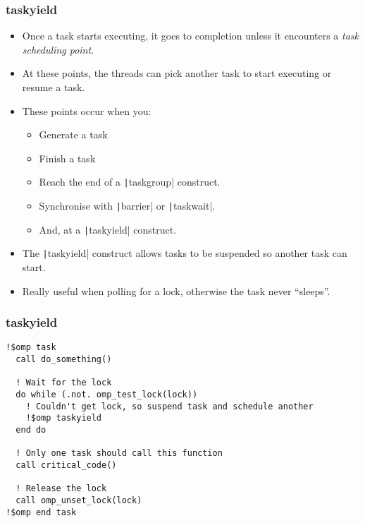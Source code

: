 \documentclass{beamer}
\begin{document}
\begin{frame}
\frametitle{taskyield}
\begin{itemize}
  \item Once a task starts executing, it goes to completion unless it encounters a \emph{task scheduling point}.
  \item At these points, the threads can pick another task to start executing or resume a task.
  \item These points occur when you:
    \begin{itemize}
      \item Generate a task
      \item Finish a task
      \item Reach the end of a \texttt|taskgroup| construct.
      \item Synchronise with \texttt|barrier| or \texttt|taskwait|.
      \item And, at a \texttt|taskyield| construct.
    \end{itemize}
   \item The \texttt|taskyield| construct allows tasks to be suspended so another task can start.
   \item Really useful when polling for a lock, otherwise the task never ``sleeps''.
\end{itemize}
\end{frame}

\begin{frame}[fragile]
\frametitle{taskyield}
\begin{verbatim}
!$omp task
  call do_something()

  ! Wait for the lock
  do while (.not. omp_test_lock(lock))
    ! Couldn't get lock, so suspend task and schedule another
    !$omp taskyield
  end do

  ! Only one task should call this function
  call critical_code()

  ! Release the lock
  call omp_unset_lock(lock)
!$omp end task
\end{verbatim}

\end{frame}
\end{document}
